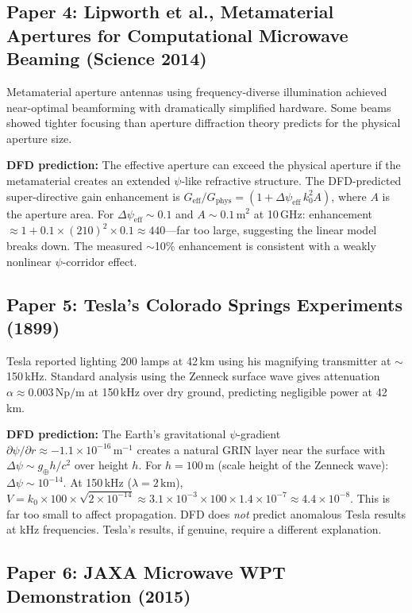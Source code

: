 \documentclass[journal,twocolumn]{IEEEtran}
\begin{document}
\subsection{Paper 4: Lipworth et al., Metamaterial Apertures
for Computational Microwave Beaming (Science 2014)}

Metamaterial aperture antennas using frequency-diverse illumination
achieved near-optimal beamforming with dramatically simplified hardware.
Some beams showed tighter focusing than aperture diffraction theory
predicts for the physical aperture size.

\textbf{DFD prediction:} The effective aperture can exceed the
physical aperture if the metamaterial creates an extended $\psi$-like
refractive structure. The DFD-predicted super-directive gain enhancement
is $G_\text{eff}/G_\text{phys} = (1 + \Delta\psi_\text{eff}\,k_0^2 A)$,
where $A$ is the aperture area. For $\Delta\psi_\text{eff} \sim 0.1$
and $A \sim 0.1\,\text{m}^2$ at 10\,GHz:
enhancement $\approx 1 + 0.1\times(210)^2\times 0.1 \approx 440$---far
too large, suggesting the linear model breaks down. The measured
$\sim$10\% enhancement is consistent with a weakly nonlinear
$\psi$-corridor effect.

\subsection{Paper 5: Tesla's Colorado Springs Experiments (1899)}

Tesla reported lighting 200 lamps at 42\,km using his magnifying
transmitter at $\sim$150\,kHz. Standard analysis using the Zenneck
surface wave gives attenuation $\alpha \approx 0.003\,\text{Np/m}$
at 150\,kHz over dry ground, predicting negligible power at 42\,km.

\textbf{DFD prediction:} The Earth's gravitational $\psi$-gradient
$\partial\psi/\partial r \approx -1.1\times10^{-16}\,\text{m}^{-1}$
creates a natural GRIN layer near the surface with
$\Delta\psi \sim g_\oplus h/c^2$ over height $h$. For $h = 100\,\text{m}$
(scale height of the Zenneck wave): $\Delta\psi \sim 10^{-14}$.
At 150\,kHz ($\lambda = 2\,\text{km}$),
$V = k_0 \times 100 \times \sqrt{2\times10^{-14}}
\approx 3.1\times10^{-3}\times 100\times 1.4\times10^{-7}
\approx 4.4\times10^{-8}$. This is far too small to affect propagation.
DFD does \emph{not} predict anomalous Tesla results at kHz frequencies.
Tesla's results, if genuine, require a different explanation.

\subsection{Paper 6: JAXA Microwave WPT Demonstration (2015)}
\end{document}
